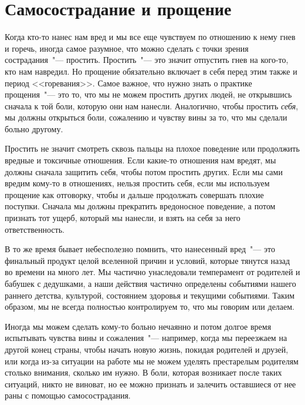 
\chapter{Самосострадание и прощение} \label{Self-Compassion_and_Forgiveness}

Когда кто-то нанес нам вред и мы все еще чувствуем по отношению к нему гнев и горечь, иногда самое разумное, что можно сделать с точки зрения сострадания~"--- простить. Простить~"--- это значит отпустить гнев на кого-то, кто нам навредил. Но прощение обязательно включает в себя перед этим также и период <<горевания>>\cite{112}. Самое важное, что нужно знать о практике прощения~"--- это то, что мы не можем простить других людей, не открывшись сначала к той боли, которую они нам нанесли. Аналогично, чтобы простить \emph{себя}, мы должны открыться боли, сожалению и чувству вины за то, что мы сделали больно другому. 

Простить не значит смотреть сквозь пальцы на плохое поведение или продолжить вредные и токсичные отношения. Если какие-то отношения нам вредят, мы должны сначала защитить себя, чтобы потом простить других. Если мы сами вредим кому-то в отношениях, нельзя простить себя, если мы используем прощение как отговорку, чтобы и дальше продолжать совершать плохие поступки. Сначала мы должны прекратить вредоносное поведение, а потом признать тот ущерб, который мы нанесли, и взять на себя за него ответственность. 

В то же время бывает небесполезно помнить, что нанесенный вред~"--- это финальный продукт целой вселенной причин и условий, которые тянутся назад во времени на много лет. Мы частично унаследовали темперамент от родителей и бабушек с дедушками, а наши действия частично определены событиями нашего раннего детства, культурой, состоянием здоровья и текущими событиями. Таким образом, мы не всегда полностью контролируем то, что мы говорим или делаем. 

Иногда мы можем сделать кому-то больно нечаянно и потом долгое время испытывать чувства вины и сожаления~"--- например, когда мы переезжаем на другой конец страны, чтобы начать новую жизнь, покидая родителей и друзей, или когда из-за ситуации на работе мы не можем уделять престарелым родителям столько внимания, сколько им нужно. В боли, которая возникает после таких ситуаций, никто не виноват, но ее можно признать и залечить оставшиеся от нее раны с помощью самосострадания. 

